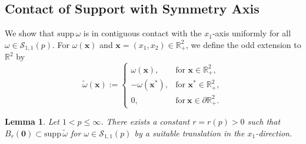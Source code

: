\documentclass[11pt]{amsart}
\newtheorem{lemma}[theorem]{Lemma}
\theoremstyle{definition}
\theoremstyle{definition}
\numberwithin{equation}{section}
\newcommand{\tld}[1]{\widetilde{#1}}
\newcommand{\supp}{{\mathrm{supp}}\,}
\newcommand{\0}{\emptyset}
\newcommand{\calS}{\mathcal S}
\begin{document}
			\subsection{Contact of Support with Symmetry Axis}
			
			We show that $\supp {\omega}$ is in contiguous contact with the $x_1$-axis uniformly for all $\omega \in \calS_{1,1}({p})$. For $\omega(\mathbf{x})$ and $\mathbf{x} = (x_1, x_2) \in \mathbb{R}^2_+$, we define the odd extension to $\mathbb{R}^{2}$ by  
			\[
			\tld{\omega}(\mathbf{x}) :=  
			\begin{cases}  
				\omega(\mathbf{x}), & \text{for } \mathbf{x} \in \mathbb{R}^2_+, \\  
				-\omega(\mathbf{x}^*), & \text{for } \mathbf{x}^* \in \mathbb{R}^2_+, \\  
				0, &\text{for}\ \mathbf{x} \in \partial \mathbb{R}^2_+.
			\end{cases}  
			\]
			
			\begin{lemma}
				\label{prop_touching}    
				Let $1<p \leq \infty$. There exists a constant $r = r(p) > 0$ such that $B_{r}(\mathbf{0}) \subset \supp \widetilde{\omega}$ for $\omega \in \calS_{1,1}({p})$ by a suitable translation in the $x_1$-direction.
			\end{lemma}
			
\end{document}
